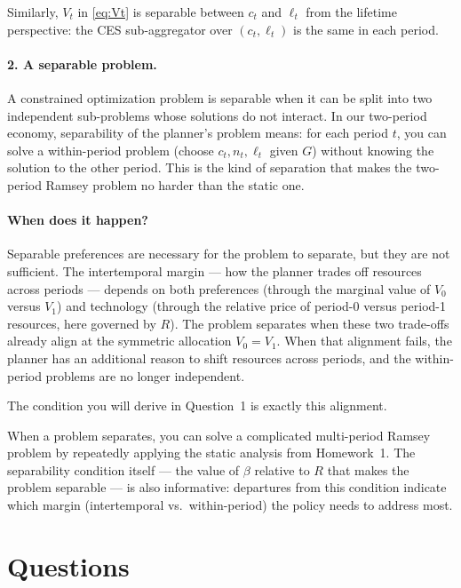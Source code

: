 Similarly, $V_t$ in \eqref{eq:Vt} is separable between $c_t$ and $\ell_t$ from the lifetime perspective: the CES sub-aggregator over $(c_t, \ell_t)$ is the same in each period.
 
\paragraph{2. A separable problem.}
A constrained optimization problem is separable when it can be split into two independent sub-problems whose solutions do not interact. In our two-period economy, separability of the planner's problem means: for each period $t$, you can solve a within-period problem (choose $c_t, n_t, \ell_t$ given $G$) without knowing the solution to the other period. This is the kind of separation that makes the two-period Ramsey problem no harder than the static one.
 
\paragraph{When does it happen?}
Separable preferences are necessary for the problem to separate, but they are not sufficient. The intertemporal margin --- how the planner trades off resources across periods --- depends on both preferences (through the marginal value of $V_0$ versus $V_1$) and technology (through the relative price of period-0 versus period-1 resources, here governed by $R$). The problem separates when these two trade-offs already align at the symmetric allocation $V_0 = V_1$. When that alignment fails, the planner has an additional reason to shift resources across periods, and the within-period problems are no longer independent.
 
The condition you will derive in Question~1 is exactly this alignment.
 
\begin{calloutnote}
When a problem separates, you can solve a complicated multi-period Ramsey problem by repeatedly applying the static analysis from Homework~1. The separability condition itself --- the value of $\beta$ relative to $R$ that makes the problem separable --- is also informative: departures from this condition indicate which margin (intertemporal vs.\ within-period) the policy needs to address most.
\end{calloutnote}
 
\section{Questions}
\label{sec:questions}
 
